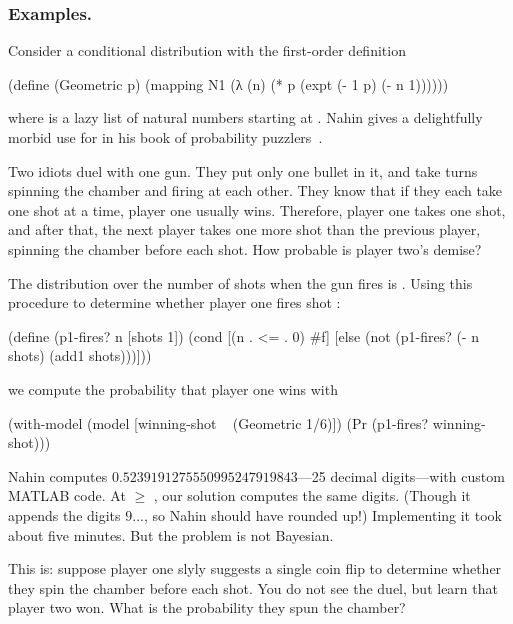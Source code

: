 \subsubsection{Examples.}
Consider a conditional distribution with the first-order definition
\begin{center}
\singlespacing
\begin{schemedisplay}
(define (Geometric p)
  (mapping N1 (λ (n) (* p (expt (- 1 p) (- n 1))))))
\end{schemedisplay}
\end{center}
where  is a lazy list of natural numbers starting at . Nahin gives a delightfully morbid use for  in his book of probability puzzlers~\cite{cit:nahin-book}.

Two idiots duel with one gun. They put only one bullet in it, and take turns spinning the chamber and firing at each other. They know that if they each take one shot at a time, player one usually wins. Therefore, player one takes one shot, and after that, the next player takes one more shot than the previous player, spinning the chamber before each shot. How probable is player two's demise?

The distribution over the number of shots when the gun fires is . Using this procedure to determine whether player one fires shot :
\begin{center}
\singlespacing
\begin{schemedisplay}
(define (p1-fires? n [shots 1])
  (cond [(n . <= . 0)  #f]
        [else  (not (p1-fires? (- n shots) (add1 shots)))]))
\end{schemedisplay}
\end{center}
we compute the probability that player one wins with
\begin{center}
\singlespacing
\begin{schemedisplay}
(with-model (model [winning-shot ~ (Geometric 1/6)])
  (Pr (p1-fires? winning-shot)))
\end{schemedisplay}
\end{center}
Nahin computes $0.5239191275550995247919843$---25 decimal digits---with custom MATLAB code. At  $\ge$ , our solution computes the same digits. (Though it appends the digits $9...$, so Nahin should have rounded up!) Implementing it took about five minutes. But the problem is not Bayesian.

This is: suppose player one slyly suggests a single coin flip to determine whether they spin the chamber before each shot. You do not see the duel, but learn that player two won. What is the probability they spun the chamber?

